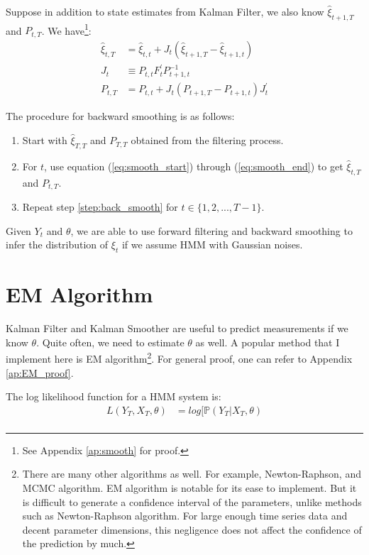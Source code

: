 \documentclass[12pt]{article}
\newenvironment{boenumerate}
    {\begin{enumerate}\renewcommand\labelenumi{\textbf\theenumi}}
    {\end{enumerate}}
\numberwithin{equation}{section}
\begin{document}
Suppose in addition to state estimates from Kalman Filter, we also know $\hat{\xi}_{t+1,T}$ and $P_{t,T}$. We have\footnote{See Appendix \ref{ap:smooth} for proof.}:
\begin{align}
    \hat{\xi}_{t,T} &= \hat{\xi}_{t,t} + J_t(\hat{\xi}_{t+1,T}-\hat{\xi}_{t+1,t}) \label{eq:smooth_start} \\
    J_t & \equiv P_{t,t}F_t^{'}P_{t+1,t}^{-1} \\
    P_{t,T} &= P_{t,t} + J_t(P_{t+1,T}-P_{t+1,t})J_t^{'} \label{eq:smooth_end}
\end{align}

The procedure for backward smoothing is as follows:
\begin{boenumerate}
    \item Start with $\hat{\xi}_{T,T}$ and $P_{T,T}$ obtained from the filtering process.
    \item \label{step:back_smooth} For $t$, use equation (\ref{eq:smooth_start}) through (\ref{eq:smooth_end}) to get $\hat{\xi}_{t,T}$ and $P_{t,T}$.
    \item Repeat step \ref{step:back_smooth} for $t \in \{1,2,...,T-1\}$.
\end{boenumerate}

Given $Y_t$ and $\theta$, we are able to use forward filtering and backward smoothing to infer the distribution of $\xi_t$ if we assume HMM with Gaussian noises. 

\section{EM Algorithm} \label{sec:EM}
Kalman Filter and Kalman Smoother are useful to predict measurements if we know $\theta$. Quite often, we need to estimate $\theta$ as well. A popular method that I implement here is EM algorithm\footnote{There are many other algorithms as well. For example, Newton-Raphson, and MCMC algorithm. EM algorithm is notable for its ease to implement. But it is difficult to generate a confidence interval of the parameters, unlike methods such as Newton-Raphson algorithm. For large enough time series data and decent parameter dimensions, this negligence does not affect the confidence of the prediction by much.}. For general proof, one can refer to Appendix \ref{ap:EM_proof}.

The log likelihood function for a HMM system is:
\begin{align*}
    L(Y_T,X_T, \theta) &= log[\mathbb{P}(Y_T|X_T,\theta) \\
\end{align*}
\end{document}
